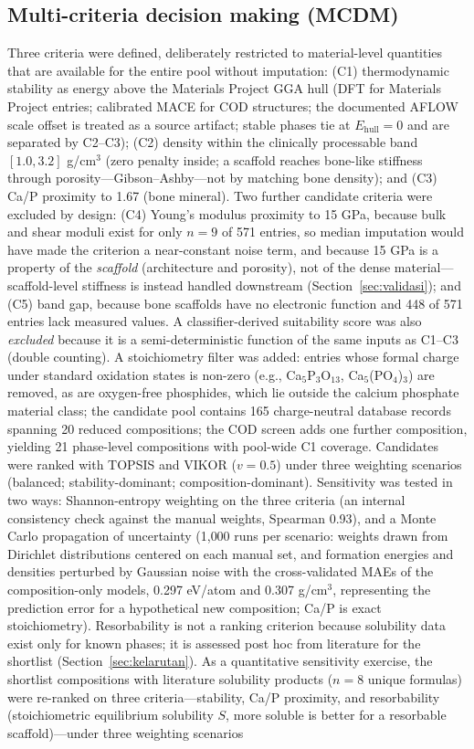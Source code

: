\documentclass[11pt,a4paper]{article}
\begin{document}
\subsection{Multi-criteria decision making (MCDM)}
Three criteria were defined, deliberately restricted to material-level quantities that are available for the entire pool without imputation: (C1) thermodynamic stability as energy above the Materials Project GGA hull (DFT for Materials Project entries; calibrated MACE for COD structures; the documented AFLOW scale offset is treated as a source artifact; stable phases tie at $E_\mathrm{hull}=0$ and are separated by C2--C3); (C2) density within the clinically processable band $[1.0, 3.2]$ g/cm$^3$ (zero penalty inside; a scaffold reaches bone-like stiffness through porosity---Gibson--Ashby---not by matching bone density); and (C3) Ca/P proximity to 1.67 (bone mineral). Two further candidate criteria were excluded by design: (C4) Young's modulus proximity to 15 GPa, because bulk and shear moduli exist for only $n=9$ of 571 entries, so median imputation would have made the criterion a near-constant noise term, and because 15 GPa is a property of the \emph{scaffold} (architecture and porosity), not of the dense material---scaffold-level stiffness is instead handled downstream (Section~\ref{sec:validasi}); and (C5) band gap, because bone scaffolds have no electronic function and 448 of 571 entries lack measured values. A classifier-derived suitability score was also \emph{excluded} because it is a semi-deterministic function of the same inputs as C1--C3 (double counting). A stoichiometry filter was added: entries whose formal charge under standard oxidation states is non-zero (e.g., Ca$_5$P$_3$O$_{13}$, Ca$_5$(PO$_4$)$_3$) are removed, as are oxygen-free phosphides, which lie outside the calcium phosphate material class; the candidate pool contains 165 charge-neutral database records spanning 20 reduced compositions; the COD screen adds one further composition, yielding 21 phase-level compositions with pool-wide C1 coverage. Candidates were ranked with TOPSIS and VIKOR ($v=0.5$) under three weighting scenarios (balanced; stability-dominant; composition-dominant). Sensitivity was tested in two ways: Shannon-entropy weighting on the three criteria (an internal consistency check against the manual weights, Spearman 0.93), and a Monte Carlo propagation of uncertainty (1{,}000 runs per scenario: weights drawn from Dirichlet distributions centered on each manual set, and formation energies and densities perturbed by Gaussian noise with the cross-validated MAEs of the composition-only models, 0.297 eV/atom and 0.307 g/cm$^3$, representing the prediction error for a hypothetical new composition; Ca/P is exact stoichiometry). Resorbability is not a ranking criterion because solubility data exist only for known phases; it is assessed post hoc from literature for the shortlist (Section~\ref{sec:kelarutan}). As a quantitative sensitivity exercise, the shortlist compositions with literature solubility products ($n=8$ unique formulas) were re-ranked on three criteria---stability, Ca/P proximity, and resorbability (stoichiometric equilibrium solubility $S$, more soluble is better for a resorbable scaffold)---under three weighting scenarios 
\end{document}
